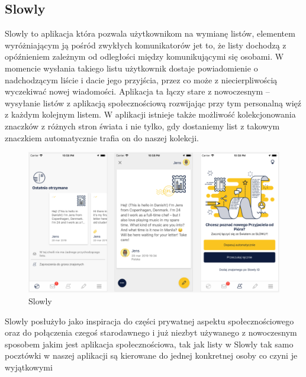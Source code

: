 \documentclass[a4paper,twoside,12pt]{book}
\begin{document}
\subsection{Slowly}
Slowly to aplikacja która pozwala użytkownikom na wymianę listów, elementem wyróżniającym ją pośród zwykłych komunikatorów jet to, że listy dochodzą z opóźnieniem zależnym od odległości między komunikującymi się osobami. W momencie wysłania takiego listu użytkownik dostaje powiadomienie o nadchodzącym liście i dacie jego przyjścia, przez co może z niecierpliwością wyczekiwać nowej wiadomości. Aplikacja ta łączy stare z nowoczesnym -- wysyłanie listów z aplikacją społecznościową rozwijając przy tym personalną więź z każdym kolejnym listem. W aplikacji istnieje także możliwość kolekcjonowania znaczków z różnych stron świata i nie tylko, gdy dostaniemy list z takowym znaczkiem automatycznie trafia on do naszej kolekcji.
\begin{figure}[H]
    \centering
    \includegraphics[width=1\textwidth]{apki_ss/slowly.png}
    \caption{Slowly}
\end{figure}
Slowly posłużyło jako inspiracja do części prywatnej aspektu społecznościowego oraz do połączenia czegoś starodawnego i już niezbyt używanego z nowoczesnym sposobem jakim jest aplikacja społecznościowa, tak jak listy w Slowly tak samo pocztówki w naszej aplikacji są kierowane do jednej konkretnej osoby co czyni je wyjątkowymi
\newpage
\end{document}
